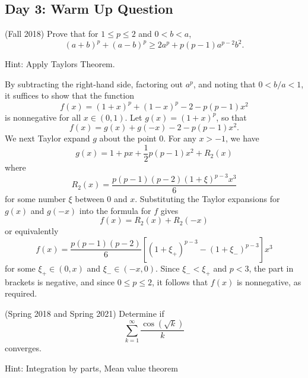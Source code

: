 \documentclass{exam}
\theoremstyle{problemstyle}
\newcommand{\1}[1]{\textbf{1}_{\left[#1\right]}} %
\def\blue{\color{Blue}}
\newcommand{\bnote}[1]{{\blue#1}} %
\begin{document}
\begin{questions}
\section*{Day 3: Warm Up Question}

\question (Fall 2018) 
Prove that for $1\leq p \leq 2$ and $0<b<a$, $$(a+b)^p + (a-b)^p \geq 2a^p + p(p-1)a^{p-2}b^2.$$

\begin{solution}
	\bnote{Hint: Apply Taylors Theorem.}

  By subtracting the right-hand side, factoring out $a^p$, and noting that $0<b/a<1$, it suffices to show that the function
  \begin{equation*}
    f(x) = \left( 1+x \right)^{p} + \left( 1-x \right)^{p} - 2 - p(p-1)x ^{2}
  \end{equation*}
  is nonnegative for all $x\in (0,1)$. Let $g(x) = (1+x)^p$, so that
  \begin{equation*}
    f(x) = g(x)+ g(-x) -2 - p(p-1)x^{2}.
  \end{equation*}
  We next Taylor expand $g$ about the point $0$.
  For any $x>-1$, we have
  \begin{equation*}
    g(x) = 1 + px + \frac{1}{2}p(p-1)x^{2} + R_{2}(x)
  \end{equation*}
  where
  \begin{equation*}
    R_{2}(x)= \frac{p(p-1)(p-2)(1+\xi)^{p-3}x^{3}}{6}
  \end{equation*}
  for some number $\xi$ between $0$ and $x$. Substituting the Taylor expansions for $g(x)$ and $g(-x)$ into the formula for $f$ gives
  \begin{equation*}
    f(x) = R_{2}(x) + R_{2}(-x)
  \end{equation*}
  or equivalently
  \begin{equation*}
    f(x) = \frac{p(p-1)(p-2)}{6} \left[(1+\xi_{+})^{p-3}-(1+\xi_{-})^{p-3}\right]x^{3}
  \end{equation*}
  for some $\xi_{+}\in(0,x)$ and $\xi_{-}\in(-x,0)$. Since $\xi_{-}<\xi_{+}$ and $p<3$, the part in brackets is negative, and since $0\leq p \leq 2$, it follows that $f(x)$ is nonnegative, as required.
\end{solution}

\question (Spring 2018 and Spring 2021)
  Determine if
  \begin{equation*}
    \sum_{k=1}^{\infty}\frac{\cos(\sqrt{k})}{k}
  \end{equation*}
  converges.

\begin{solution}
\bnote{Hint: Integration by parts, Mean value theorem}


\end{solution}
\end{questions}
\end{document}
